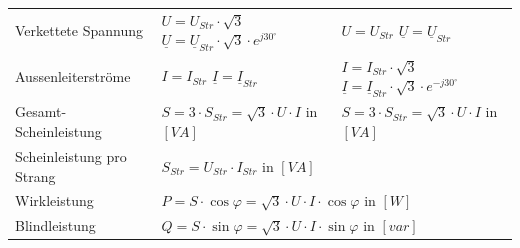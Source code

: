 \begin{tabular}{| p{4.5cm} | l | l |}
		 			Verkettete Spannung &
		 				$U = U_{Str} \cdot \sqrt{3}$ \hspace{0.2cm} $\underline{U} = \underline{U}_{Str} \cdot \sqrt{3} \cdot e^{j 30^\circ}$ &
		 				$U = U_{Str}$ \hspace{0.2cm} $\underline{U} = \underline{U}_{Str}$ \\
		 			Aussenleiterstr\"ome &
		 				$I = I_{Str}$ \hspace{0.2cm} $\underline{I} = \underline{I}_{Str}$ &
		 				$I = I_{Str} \cdot \sqrt{3} $ \hspace{0.2cm} $\underline{I} =
		 				\underline{I}_{Str} \cdot \sqrt{3} \cdot e^{-j 30^\circ} $ \\ Gesamt-Scheinleistung &
		 				$S = 3 \cdot S_{Str} =\sqrt{3} \cdot U \cdot I $ \hspace{0.2cm} in $[VA]$
		 				& $S = 3 \cdot S_{Str} = \sqrt{3} \cdot U \cdot I$ \hspace{0.2cm} in $[VA]$ \\ Scheinleistung pro Strang &
		 				\multicolumn{2}{l|}{\hspace{3cm} $S_{Str} = U_{Str} \cdot I_{Str}$ \hspace{0.2cm} in $[VA]$} \\
		 			Wirkleistung &
		 				\multicolumn{2}{l|}{\hspace{3cm} $P = S \cdot \cos\varphi = \sqrt{3} \cdot U \cdot I \cdot \cos\varphi$ \hspace{0.2cm} in $[W]$} \\
		 			Blindleistung &
		 				\multicolumn{2}{l|}{\hspace{3cm} $Q = S \cdot \sin\varphi = \sqrt{3} \cdot U \cdot I \cdot \sin\varphi$ \hspace{0.2cm} in $[var]$} \\
	 			\hline
			\end{tabular}
        \renewcommand{\arraystretch}{1}
		
